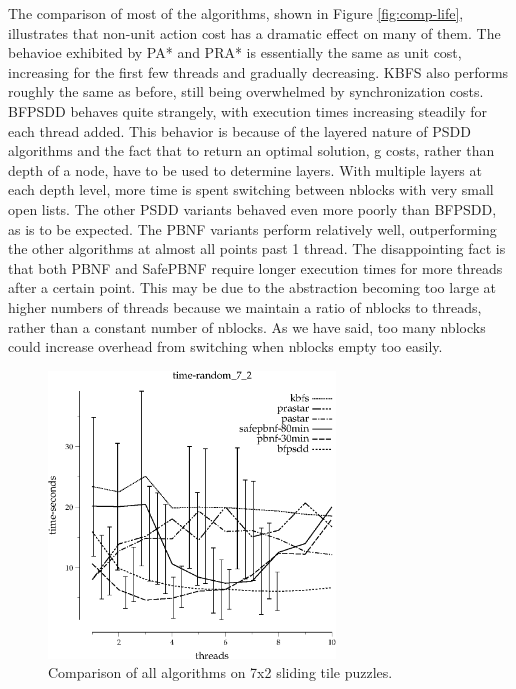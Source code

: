 \documentclass{article}
\begin{document}
The comparison of most of the algorithms, shown in Figure \ref{fig:comp-life}, illustrates that non-unit action cost has a dramatic effect on many of them. The behavioe exhibited by PA* and PRA* is essentially the same as unit cost, increasing for the first few threads and gradually decreasing. KBFS also performs roughly the same as before, still being overwhelmed by synchronization costs. BFPSDD behaves quite strangely, with execution times increasing steadily for each thread added. This behavior is because of the layered nature of PSDD algorithms and the fact that to return an optimal solution, g costs, rather than depth of a node, have to be used to determine layers. With multiple layers at each depth level, more time is spent switching between nblocks with very small open lists. The other PSDD variants behaved even more poorly than BFPSDD, as is to be expected. The PBNF variants perform relatively well, outperforming the other algorithms at almost all points past 1 thread. The disappointing fact is that both PBNF and SafePBNF require longer execution times for more threads after a certain point. This may be due to the abstraction becoming too large at higher numbers of threads because we maintain a ratio of nblocks to threads, rather than a constant number of nblocks. As we have said, too many nblocks could increase overhead from switching when nblocks empty too easily.

\begin{figure}[h!]
\includegraphics[width=3in]{../graphs/seth/time-random_7_2.eps}
\caption{Comparison of all algorithms on 7x2 sliding tile puzzles.}
\label{fig:comp-tile}
\end{figure}
\end{document}
